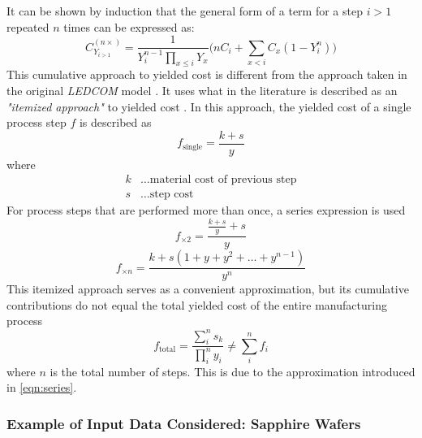 \documentclass[parskip=full]{article}
\begin{document}
%
It can be shown by induction that the general form of a term for a step $i>1$ repeated $n$ times can be expressed as:
%
\begin{equation}
\label{eqn:yielded_cost}
    C_{Y_{i>1}}^{(n \times)} = \frac{1}{Y_i^{n-1} \prod_{x \leq i} Y_x} \bigg( nC_i + \sum_{x < i} C_x (1-Y_i^n) \bigg)
\end{equation}
%
This cumulative approach to yielded cost is different from the approach taken in the original \textit{LEDCOM} model \cite{ledcomv2}. It uses what in the literature is described as an \textit{"itemized approach"} to yielded cost \cite{becker2001use}. In this approach, the yielded cost of a single process step $f$ is described as
%
\begin{equation}
    f_\text{single} = \frac{k+s}{y}
\end{equation}
%
where
%
\begin{align*}
    k &\dots \text{material cost of previous step} \\
    s &\dots \text{step cost}
\end{align*}
%
For process steps that are performed more than once, a series expression is used
%
\begin{equation}
    f_{\times 2} =  \frac{\frac{k+s}{y}+s}{y}
\end{equation}
\begin{equation}
\label{eqn:series}
    f_{\times n} = \frac{k + s(1+y+y^2+ \dots + y^{n-1})}{y^n}
\end{equation}
%
This itemized approach serves as a convenient approximation, but its cumulative contributions do not equal the total yielded cost of the entire manufacturing process
%
\begin{equation}
    f_\text{total} = \frac{\sum_i^n s_k}{\prod_i^n y_i} \neq \sum_i^n f_i
\end{equation}
%
where $n$ is the total number of steps. This is due to the approximation introduced in \cref{eqn:series}.

\subsubsection{Example of Input Data Considered: Sapphire Wafers}
\end{document}
